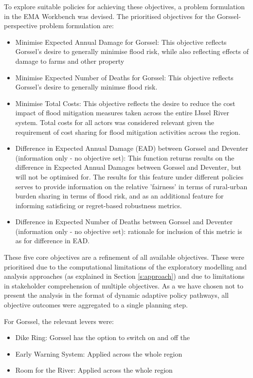 To explore suitable policies for achieving these objectives, a problem formulation in the EMA Workbench was devised.
The prioritised objectives for the Gorssel-perspective problem formulation are:
\begin{itemize}
    \item Minimise Expected Annual Damage for Gorssel: This objective reflects Gorssel's desire to generally minimise flood risk, while also reflecting effects of damage to farms and other property
    \item Minimise Expected Number of Deaths for Gorssel: This objective reflects Gorssel's desire to generally minimse flood risk.
    \item Minimise Total Costs: This objective reflects the desire to reduce the cost impact of flood mitigation measures taken across the entire IJssel River system. Total costs for all actors was considered relevant given the requirement of cost sharing for flood mitigation activities across the region.
    \item Difference in Expected Annual Damage (EAD) between Gorssel and Deventer (information only - no objective set): This function returns results on the difference in Expected Annual Damages between Gorssel and Deventer, but will not be optimised for. The results for this feature under different policies serves to provide information on the relative 'fairness' in terms of rural-urban burden sharing in terms of flood risk, and as an additional feature for informing satisficing or regret-based robustness metrics.
    \item Difference in Expected Number of Deaths between Gorssel and Deventer (information only - no objective set): rationale for inclusion of this metric is as for difference in EAD.
\end{itemize}
These five core objectives are a refinement of all available objectives. These were prioritised due to the computational limitations of the exploratory modelling and analysis approaches (as explained in Section \ref{s:approach}) and due to limitations in stakeholder comprehension of multiple objectives. As a we have chosen not to present the analysis in the format of dynamic adaptive policy pathways, all objective outcomes were aggregated to a single planning step.

For Gorssel, the relevant levers were:
\begin{itemize}
    \item Dike Ring: Gorssel has the option to switch on and off the 
    \item Early Warning System: Applied across the whole region
    \item Room for the River: Applied across the whole region
\end{itemize}

